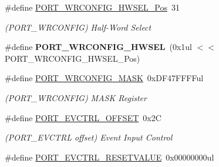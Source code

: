 \begin{DoxyCompactItemize}
\item 
\hypertarget{group___s_a_m_l21___p_o_r_t_gac3b5f0e8062dcbecbc11d515cbc11dd1}{}\#define \hyperlink{group___s_a_m_l21___p_o_r_t_gac3b5f0e8062dcbecbc11d515cbc11dd1}{P\+O\+R\+T\+\_\+\+W\+R\+C\+O\+N\+F\+I\+G\+\_\+\+H\+W\+S\+E\+L\+\_\+\+Pos}~31\label{group___s_a_m_l21___p_o_r_t_gac3b5f0e8062dcbecbc11d515cbc11dd1}

\begin{DoxyCompactList}\small\item\em (P\+O\+R\+T\+\_\+\+W\+R\+C\+O\+N\+F\+I\+G) Half-\/\+Word Select \end{DoxyCompactList}\item 
\hypertarget{group___s_a_m_l21___p_o_r_t_ga4b024ac159d2b916326b97c1db752185}{}\#define {\bfseries P\+O\+R\+T\+\_\+\+W\+R\+C\+O\+N\+F\+I\+G\+\_\+\+H\+W\+S\+E\+L}~(0x1ul $<$$<$ P\+O\+R\+T\+\_\+\+W\+R\+C\+O\+N\+F\+I\+G\+\_\+\+H\+W\+S\+E\+L\+\_\+\+Pos)\label{group___s_a_m_l21___p_o_r_t_ga4b024ac159d2b916326b97c1db752185}

\item 
\hypertarget{group___s_a_m_l21___p_o_r_t_ga3d16ca9f7506e69958fe01fcffb6f8fd}{}\#define \hyperlink{group___s_a_m_l21___p_o_r_t_ga3d16ca9f7506e69958fe01fcffb6f8fd}{P\+O\+R\+T\+\_\+\+W\+R\+C\+O\+N\+F\+I\+G\+\_\+\+M\+A\+S\+K}~0x\+D\+F47\+F\+F\+F\+Ful\label{group___s_a_m_l21___p_o_r_t_ga3d16ca9f7506e69958fe01fcffb6f8fd}

\begin{DoxyCompactList}\small\item\em (P\+O\+R\+T\+\_\+\+W\+R\+C\+O\+N\+F\+I\+G) M\+A\+S\+K Register \end{DoxyCompactList}\item 
\hypertarget{group___s_a_m_l21___p_o_r_t_ga4b64423d2758a4f1bba1badf79821d40}{}\#define \hyperlink{group___s_a_m_l21___p_o_r_t_ga4b64423d2758a4f1bba1badf79821d40}{P\+O\+R\+T\+\_\+\+E\+V\+C\+T\+R\+L\+\_\+\+O\+F\+F\+S\+E\+T}~0x2\+C\label{group___s_a_m_l21___p_o_r_t_ga4b64423d2758a4f1bba1badf79821d40}

\begin{DoxyCompactList}\small\item\em (P\+O\+R\+T\+\_\+\+E\+V\+C\+T\+R\+L offset) Event Input Control \end{DoxyCompactList}\item 
\hypertarget{group___s_a_m_l21___p_o_r_t_ga0738c519ca0891aebbbb0c3b6c16a7e8}{}\#define \hyperlink{group___s_a_m_l21___p_o_r_t_ga0738c519ca0891aebbbb0c3b6c16a7e8}{P\+O\+R\+T\+\_\+\+E\+V\+C\+T\+R\+L\+\_\+\+R\+E\+S\+E\+T\+V\+A\+L\+U\+E}~0x00000000ul\label{group___s_a_m_l21___p_o_r_t_ga0738c519ca0891aebbbb0c3b6c16a7e8}


\end{DoxyCompactItemize}
